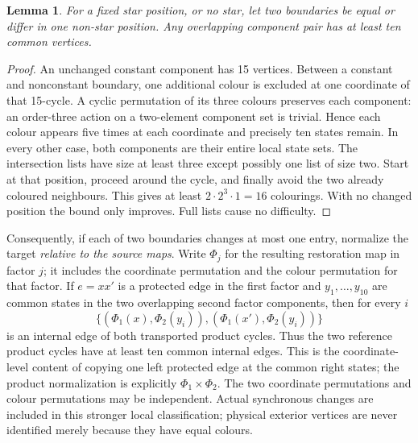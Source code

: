 \documentclass[11pt]{article}
\newtheorem{lemma}[theorem]{Lemma}
\theoremstyle{remark}
\numberwithin{equation}{section}
\numberwithin{table}{section}
\begin{document}
\begin{lemma}\label{lem:pentagon-overlap}
For a fixed star position, or no star, let two boundaries be equal or
differ in one non-star position. Any overlapping component pair has
at least ten common vertices.
\end{lemma}
\begin{proof}
An unchanged constant component has 15 vertices. Between a constant
and nonconstant boundary, one additional colour is excluded at one
coordinate of that 15-cycle. A cyclic permutation of its three colours
preserves each component: an order-three action on a two-element
component set is trivial. Hence each colour appears five times at
each coordinate and precisely ten states remain.
In every other case, both components are their entire local state
sets. The intersection lists have size at least three except possibly
one list of size two. Start at that position, proceed around the
cycle, and finally avoid the two already coloured neighbours.
This gives at least $2\cdot2^3\cdot1=16$ colourings. With no changed
position the bound only improves. Full lists cause no difficulty.
\end{proof}

Consequently, if each of two boundaries changes at most one entry,
normalize the target \emph{relative to the source maps}. Write
$\Phi_j$ for the resulting restoration map in factor $j$; it includes
the coordinate permutation and the colour permutation for that factor.
If $e=xx'$ is a protected edge in the first factor and
$y_1,\ldots,y_{10}$ are common states in the two overlapping second
factor components, then for every $i$
\[
 \bigl\{(\Phi_1(x),\Phi_2(y_i)),
        (\Phi_1(x'),\Phi_2(y_i))\bigr\}
\]
is an internal edge of both transported product cycles.  Thus the two
reference product cycles have at least ten common internal edges.  This
is the coordinate-level content of copying one left protected edge at
the common right states; the product normalization is explicitly
$\Phi_1\times\Phi_2$.  The two coordinate permutations and colour
permutations may be independent.  Actual synchronous changes are
included in this stronger local classification; physical exterior
vertices are never identified merely because they have equal colours.
\end{document}
